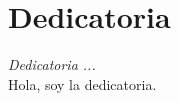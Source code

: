 \chapter*{Dedicatoria}
\begin{flushright}
  \emph{Dedicatoria ...} \\
  Hola, soy la dedicatoria.
  
\end{flushright}
\thispagestyle{empty}
